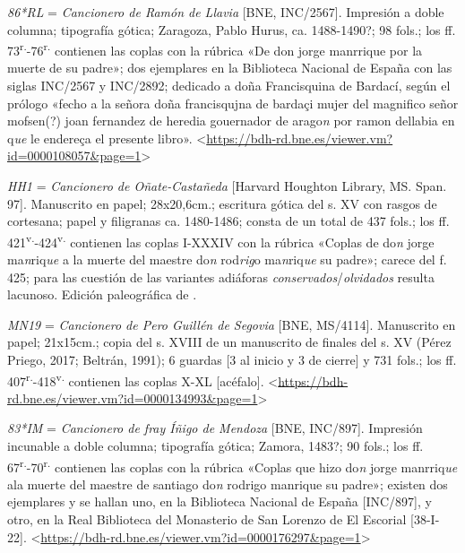 \documentclass[11pt,a4paper,twoside]{article}
\newcommand{\comillas}[1]{«#1»}
\newcommand{\tsup}[1]{\textsuperscript{#1}}
\begin{document}
\textit{86*RL} = \textit{Cancionero de Ramón de Llavia} [BNE, INC/2567].
%
Impresión a doble columna; tipografía gótica; Zaragoza, Pablo Hurus, ca. 1488-1490?; 98 fols.; los ff. 73\tsup{r.}-76\tsup{r.} contienen las coplas con la rúbrica \comillas{De don jorge manrrique por la muerte de su padre}; dos ejemplares en la Biblioteca Nacional de España con las siglas INC/2567 y INC/2892; dedicado a doña Francisquina de Bardací, según el prólogo \comillas{fecho a la señora doña francisqujna de bardaçi mujer del magnifico señor mofsen(?) joan fernandez de heredia gouernador de arago\textit{n} por ramon dellabia en q\textit{ue} le endereça el presente libro}. <\url{https://bdh-rd.bne.es/viewer.vm?id=0000108057&page=1}>\par

\textit{HH1} = \textit{Cancionero de Oñate-Castañeda} [Harvard Houghton Library, MS. Span. 97].
%
Manuscrito en papel; 28x20,6cm.; escritura gótica del s. XV con rasgos de cortesana; papel y filigranas ca. 1480-1486; consta de un total de 437 fols.; los ff. 421\tsup{v.}-424\tsup{v.} contienen las coplas I-XXXIV con la rúbrica \comillas{Coplas de do\textit{n} jorge ma\textit{n}riq\textit{ue} a la muerte del maestre do\textit{n} rod\textit{rig}o ma\textit{n}riq\textit{ue} su padre}; carece del f. 425; para las cuestión de las variantes adiáforas \textit{conservados}/\textit{olvidados} resulta lacunoso. Edición paleográfica de \textcite{Severin1990}.\par

\textit{MN19} = \textit{Cancionero de Pero Guillén de Segovia} [BNE, MS/4114].
%
Manuscrito en papel; 21x15cm.; copia del s. XVIII de un manuscrito de finales del s. XV (Pérez Priego, 2017; Beltrán, 1991); 6 guardas [3 al inicio y 3 de cierre] y 731 fols.; los ff. 407\tsup{r.}-418\tsup{v.} contienen las coplas X-XL [acéfalo]. <\url{https://bdh-rd.bne.es/viewer.vm?id=0000134993&page=1}>\par

\textit{83*IM} = \textit{Cancionero de fray Íñigo de Mendoza} [BNE, INC/897].
%
Impresión incunable a doble columna; tipografía gótica; Zamora, 1483?; 90 fols.; los ff. 67\tsup{r.}-70\tsup{r.} contienen las coplas con la rúbrica \comillas{Coplas que hizo do\textit{n} jorge manrriq\textit{ue} ala muerte del maestre de santiago do\textit{n} rodrigo manrique su padre}; existen dos ejemplares y se hallan uno, en la Biblioteca Nacional de España [INC/897], y otro, en la Real Biblioteca del Monasterio de San Lorenzo de El Escorial [38-I-22]. <\url{https://bdh-rd.bne.es/viewer.vm?id=0000176297&page=1}>\par
\end{document}
